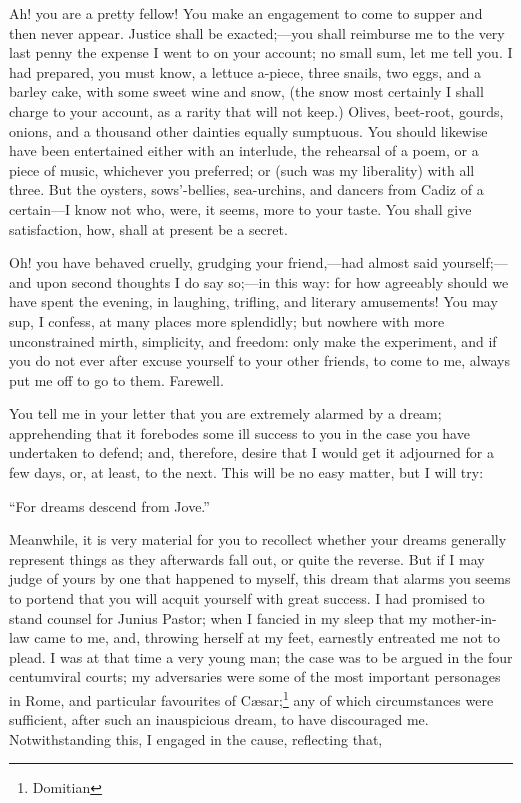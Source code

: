 Ah! you are a pretty fellow! You make an engagement to come to supper and
then never appear. Justice shall be exacted;—you shall reimburse me
to the very last penny the expense I went to on your account; no small
sum, let me tell you. I had prepared, you must know, a lettuce a-piece,
three snails, two eggs, and a barley cake, with some sweet wine and snow,
(the snow most certainly I shall charge to your account, as a rarity that
will not keep.) Olives, beet-root, gourds, onions, and a thousand other
dainties equally sumptuous. You should likewise have been entertained
either with an interlude, the rehearsal of a poem, or a piece of music,
whichever you preferred; or (such was my liberality) with all three. But
the oysters, sows'-bellies, sea-urchins, and dancers from Cadiz of a
certain—I know not who, were, it seems, more to your taste. You
shall give satisfaction, how, shall at present be a secret.

Oh! you have behaved cruelly, grudging your friend,—had almost said
yourself;—and upon second thoughts I do say so;—in this way:
for how agreeably should we have spent the evening, in laughing, trifling,
and literary amusements! You may sup, I confess, at many places more
splendidly; but nowhere with more unconstrained mirth, simplicity, and
freedom: only make the experiment, and if you do not ever after excuse
yourself to your other friends, to come to me, always put me off to go to
them. Farewell.


You tell me in your letter that you are extremely alarmed by a dream;
apprehending that it forebodes some ill success to you in the case you
have undertaken to defend; and, therefore, desire that I would get it
adjourned for a few days, or, at least, to the next. This will be no easy
matter, but I will try:

``For dreams descend from Jove.''

Meanwhile, it is very material for you to recollect whether your dreams
generally represent things as they afterwards fall out, or quite the
reverse. But if I may judge of yours by one that happened to myself, this
dream that alarms you seems to portend that you will acquit yourself with
great success. I had promised to stand counsel for Junius Pastor; when I
fancied in my sleep that my mother-in-law came to me, and, throwing
herself at my feet, earnestly entreated me not to plead. I was at that
time a very young man; the case was to be argued in the four centumviral
courts; my adversaries were some of the most important personages in Rome,
and particular favourites of Cæsar;\footnote{Domitian} any of which
circumstances were sufficient, after such an inauspicious dream, to have
discouraged me. Notwithstanding this, I engaged in the cause, reflecting
that,

